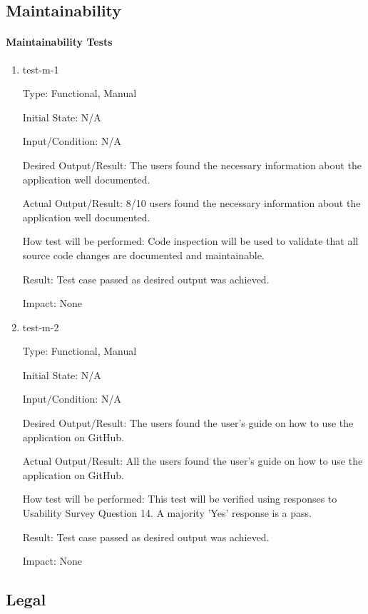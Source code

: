 \documentclass[12pt, titlepage]{article}
\begin{document}
\subsection{Maintainability}

\paragraph{Maintainability Tests}

\begin{enumerate}

\item{test-m-1\\}

Type: Functional, Manual		

Initial State: N/A	

Input/Condition: N/A		

Desired Output/Result: The users found the necessary information about the application well documented. 

Actual Output/Result: 8/10 users found the necessary information about the application well documented.

How test will be performed: Code inspection will be used to validate that all source code changes are documented and maintainable. 

Result: Test case passed as desired output was achieved.

Impact: None

\item{test-m-2\\}

Type: Functional, Manual

Initial State: N/A

Input/Condition: N/A

Desired Output/Result:  The users found the user's guide on how to use the application on GitHub.

Actual Output/Result: All the users found the user's guide on how to use the application on GitHub.

How test will be performed: This test will be verified using responses to Usability Survey Question 14. A majority 'Yes' response is a pass.

Result: Test case passed as desired output was achieved.

Impact: None

\end{enumerate}

\subsection{Legal}
\end{document}
